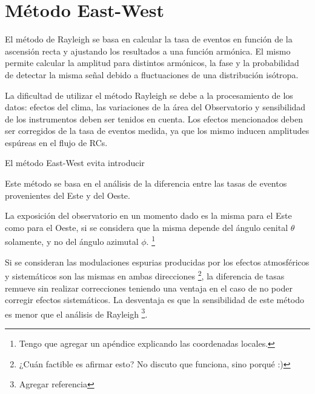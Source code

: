 
\chapter{Método East-West}

El método de Rayleigh se basa en calcular la tasa de eventos en función de la ascensión recta y ajustando los resultados a una función armónica. El mismo permite calcular la amplitud para distintos armónicos, la fase y la probabilidad de detectar la misma señal debido a fluctuaciones de una distribución isótropa. 

La dificultad de utilizar el método Rayleigh se debe a la procesamiento de los datos: efectos del clima, las variaciones de la área del Observatorio y sensibilidad de los instrumentos deben ser tenidos en cuenta.  Los efectos mencionados deben ser corregidos de la tasa de eventos medida, ya que los mismo inducen amplitudes espúreas en el flujo de RCs.

El método East-West evita introducir


Este método se basa en el análisis de la diferencia entre las tasas de eventos provenientes del Este y del Oeste.

La exposición del observatorio en un momento dado es la misma para el Este como para el Oeste, si se considera que la misma depende del ángulo cenital $\theta$ solamente, y no del ángulo azimutal $\phi$. \footnote{Tengo que agregar un apéndice explicando las coordenadas locales.}

Si se consideran las modulaciones espurias producidas por los efectos atmosféricos y sistemáticos son las mismas en ambas direcciones \footnote{¿Cuán factible es afirmar esto? No discuto que funciona, sino porqué :)}, la diferencia de tasas remueve sin realizar correcciones teniendo una ventaja en el caso de no poder corregir efectos sistemáticos. La desventaja es que la sensibilidad de este método es menor  que el análisis de Rayleigh \footnote{Agregar referencia}.



